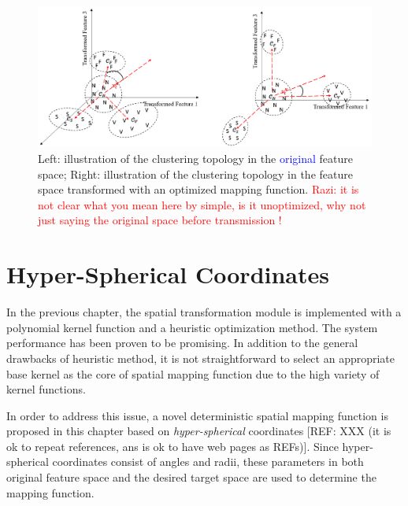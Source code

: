 \begin{figure}[t]
\centering
\includegraphics[scale=.42]{Fig/topo2.png}
\caption{Left: illustration of the clustering topology in the \textcolor{blue}{original} feature space; %
Right: illustration of the clustering topology in the feature space transformed with an optimized mapping function. \textcolor{red}{Razi: it is not clear what you mean here by simple, is it unoptimized, why not just saying the original space before transmission !}}
\label{fig:topo2}
\end{figure}

\section{Hyper-Spherical Coordinates}

In the previous chapter, the spatial transformation module is implemented with a polynomial kernel function and a heuristic optimization method. The system performance has been proven to be promising. In addition to the general drawbacks of heuristic method, it is not straightforward to select an appropriate base kernel as the core of spatial mapping function due to the high variety of kernel functions. %

In order to address this issue, a novel deterministic spatial mapping function is proposed in this chapter based on \textit{hyper-spherical} coordinates [REF: XXX (it is ok to repeat references, ans is ok to have web pages as REFs)]. Since hyper-spherical coordinates consist of angles and radii, these parameters in both original feature space and the desired target space are used to determine the mapping function.


